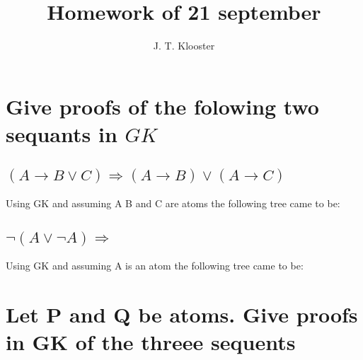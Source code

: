 \documentclass{article}
\begin{document}
\author{J. T. Klooster}
\title{Homework of 21 september}
\maketitle

\section{Give proofs of the folowing two sequants in $GK$}
\subsection{$(A\to B\vee C)\Rightarrow(A\to B)\vee(A\to C)$}
Using GK and assuming A B and C are atoms the following tree came to be:

\begin{prooftree}
\end{prooftree}

\subsection{$\neg(A\vee\neg A) \Rightarrow$}
Using GK and assuming A is an atom the following tree came to be:
\begin{prooftree}
\end{prooftree}

\section{Let P and Q be atoms. Give proofs in GK of the threee sequents}
\end{document}
